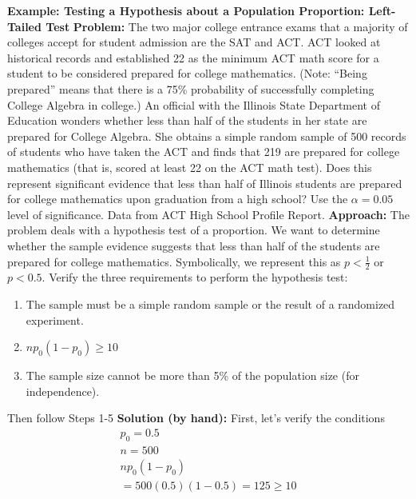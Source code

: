 \documentclass{report}
\begin{document}
    \pagebreak \bigbreak \noindent 
    \bigbreak \noindent 
    \begin{mdframed}
      \textbf{Example: Testing a Hypothesis about a Population Proportion: Left-Tailed Test}
      \bigbreak \noindent 
      \textbf{Problem:}
      The two major college entrance exams that a majority of colleges accept for student admission are the SAT and ACT. ACT looked at historical records and established 22 as the minimum ACT math score for a student to be considered prepared for college mathematics. (Note: “Being prepared” means that there is a 75\% probability of successfully completing College Algebra in college.) An official with the Illinois State Department of Education wonders whether less than half of the students in her state are prepared for College Algebra. She obtains a simple random sample of 500 records of students who have taken the ACT and finds that 219 are prepared for college mathematics (that is, scored at least 22 on the ACT math test). Does this represent significant evidence that less than half of Illinois students are prepared for college mathematics upon graduation from a high school? Use the $\alpha=0.05$ level of significance. Data from ACT High School Profile Report.
      \bigbreak \noindent 
      \textbf{Approach:}
      The problem deals with a hypothesis test of a proportion. We want to determine whether the sample evidence suggests that less than half of the students are prepared for college mathematics. Symbolically, we represent this as $p < \frac{1}{2} $ or $p < 0.5 $. Verify the three requirements to perform the hypothesis test:
        \begin{enumerate}
            \item The sample must be a simple random sample or the result of a randomized experiment.
            \item \(np_0(1-p_0) \geq 10\)
            \item The sample size cannot be more than 5\% of the population size (for independence).
        \end{enumerate}
        \bigbreak \noindent 
        Then follow Steps 1-5
        \bigbreak \noindent 
        \textbf{Solution (by hand):}
        \bigbreak \noindent 
        First, let's verify the conditions
        \begin{align*}
            p_{0} =  0.5 \\
            n = 500 \\
            np_{0}(1-p_{0}) \\ 
            = 500(0.5)(1-0.5) = 125 \geq 10 

\end{align*}
\end{mdframed}
\end{document}
